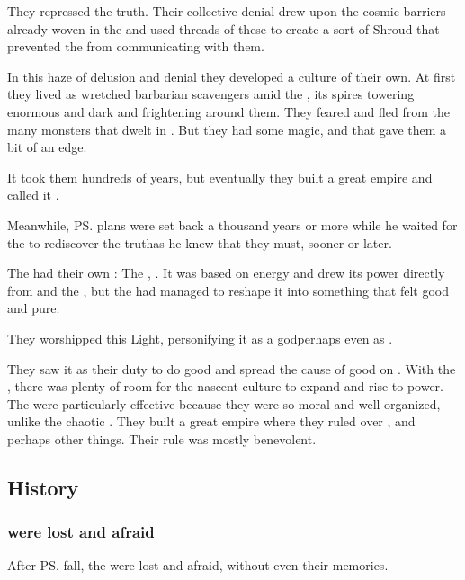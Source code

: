 They repressed the truth. 
Their collective denial drew upon the cosmic barriers already woven in the \firstbanewar{} and used threads of these to create a sort of Shroud that prevented the \banelords{} from communicating with them. 

In this haze of delusion and denial they developed a culture of their own. 
At first they lived as wretched barbarian scavengers amid the , its spires towering enormous and dark and frightening around them. 
They feared and fled from the many monsters that dwelt in \Nyx. 
But they had some magic, and that gave them a bit of an edge. 

It took them hundreds of years, but eventually they built a great empire and called it \Merkyrah.

Meanwhile, \ps{\Daggerrain}{} plans were set back a thousand years or more while he waited for the \resphain{} to rediscover the truth\dash as he knew that they must, sooner or later.

The \Merkyrans{} had their own \dweomer: 
The , . 
It was based on \Nyxian{} energy and drew its power directly from \Nyx{} and the \banelords, but the \resphain{} had managed to reshape it into something that felt good and pure. 

They worshipped this Light, personifying it as a god\dash perhaps even as . 

They saw it as their duty to do good and spread the cause of good on \Miith{}. With the , there was plenty of room for the nascent \resphan{} culture to expand and rise to power. 
The \resphain{} were particularly effective because they were so moral and well-organized, unlike the chaotic \dragons. 
They built a great empire where they ruled over \humans, \nephilim{} and perhaps other things. 
Their rule was mostly benevolent. 









\subsection{History}




\subsubsection{\Resphain were lost and afraid}
After \ps{\Thanatzil} fall, the \resphain{} were lost and afraid, without even their memories. 

